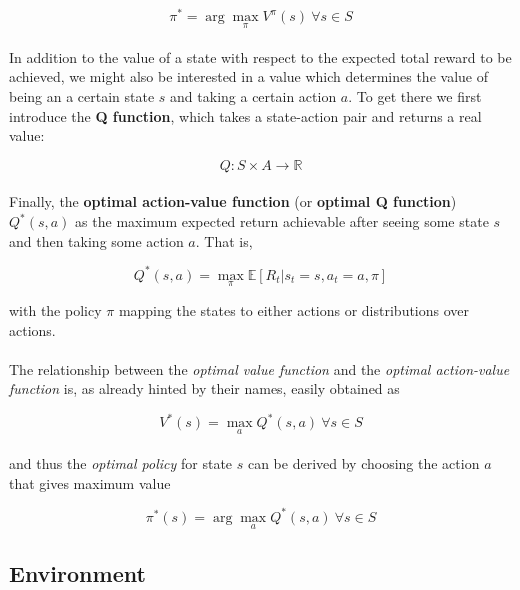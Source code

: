\begin{equation}\label{eq:value-function-policy}
\pi^{*}=\arg\max_{\pi}V^{\pi}(s)\ \forall{s}\in{S}
\end{equation}
\\
In addition to the value of a state with respect to the expected total reward to be achieved, we might also be interested in a value which determines the value of being an a certain state $s$ and taking a certain action $a$. 
To get there we first introduce the \textbf{Q function}, which takes a state-action pair and returns a real value:

\begin{equation}\label{eq:q-function}
Q:S\times{A}\rightarrow{\mathbb{R}}
\end{equation}
\\
Finally, the \textbf{optimal action-value function} (or \textbf{optimal Q function}) $Q^*(s,a)$ as the maximum expected return achievable after seeing some state $s$ and then taking some action $a$. That is, 

\begin{equation}\label{eq:optimal-action-value-function}
Q^*(s,a)=\max_{\pi}\mathbb{E} [ R_t | s_t=s, a_t=a, \pi ]
\end{equation}

with the policy $\pi$ mapping the states to either actions or distributions over actions. 
\\
\\
The relationship between the \textit{optimal value function} and the \textit{optimal action-value function} is, as already hinted by their names, easily obtained as

\begin{equation}
V^*(s)=\max_{a}Q^*(s,a)\ \forall{s}\in{S}
\end{equation}
\\
and thus the \textit{optimal policy} for state $s$ can be derived by choosing the action $a$ that gives maximum value

\begin{equation}
\pi^*(s)=\arg \max_{a} Q^*(s, a)\ \forall{s}\in{S}
\end{equation}

\subsection{Environment}
\label{sec:rl-environment}

